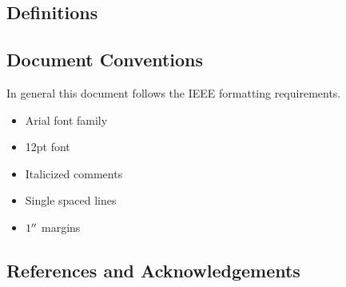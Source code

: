     \subsection{Definitions}
        \printnoidxglossary
        \printnoidxglossary[type=acronym, title=Acronyms and Abbreviations]
        \printacronyms
    \vspace{-4ex} %
    \subsection{Document Conventions}
        In general this document follows the IEEE formatting requirements.
            \begin{itemize}
                \item Arial font family
                \item 12pt font
                \item Italicized comments
                \item Single spaced lines
                \item $1^{\prime\prime}$ margins
            \end{itemize}
    \subsection{References and Acknowledgements}
        \nocite{*}
        \printbibliography[heading=none]
